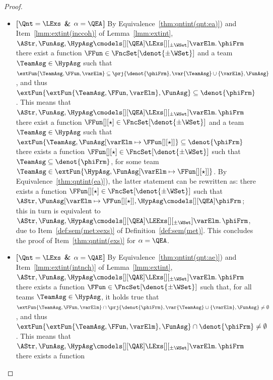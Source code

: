 \documentclass[authoryear]{elsarticle}
\newcommand{\EmpTeamAsg}{\emptyset}
\begin{document}
\begin{proof}
  \begin{itemize}[$\bullet$]
  \item\textbf{[$\Qnt = \LExs$ \& $\alpha = \QEA$]}
    By Equivalence~\ref{thm:qntint(qnt:ea)}) and Item~\ref{lmm:extint(inccoh)}
    of Lemma~\ref{lmm:extint}, $\AStr, \FunAsg, \HypAsg \cmodels[][\QEA]
    \LExs[][_{\pm\WSet}] \varElm \ldotp \phiFrm$ \iff there exist a function
    $\FFun \in \FncSet[\denot{\pm\WSet}]{}$ and a team $\TeamAsg \in \HypAsg$
    such that $\extFun{\TeamAsg, \FFun, \varElm} \subseteq \prj{\denot{\phiFrm},
      \var{\TeamAsg} \cup \{ \varElm \}, \FunAsg}$, and thus
    $\extFun{\extFun{\TeamAsg, \FFun, \varElm}, \FunAsg} \subseteq
    \denot{\phiFrm}$.
      This means that $\AStr, \FunAsg, \HypAsg \cmodels[][\QEA]
      \LExs[][_{\pm\WSet}] \varElm \ldotp \phiFrm$ \iff there exist a function
      $\FFun[][\star] \in \FncSet[\denot{\pm\WSet}]{}$ and a team $\TeamAsg \in
      \HypAsg$ such that $\extFun{\TeamAsg, {\FunAsg}[\varElm \mapsto
      \FFun[][\star]]} \subseteq \denot{\phiFrm}$ \iff there exists a function
      $\FFun[][\star] \in \FncSet[\denot{\pm\WSet}]{}$ such that $\TeamAsg
      \subseteq \denot{\phiFrm}$, for some team $\TeamAsg \in \extFun{\HypAsg,
      {\FunAsg}[\varElm \mapsto \FFun[][\star]]}$.
    By Equivalence~\ref{thm:qntint(ea)}), the latter statement can be rewritten
    as: there exists a function $\FFun[][\star] \in \FncSet[\denot{\pm\WSet}]{}$
    such that $\AStr, {\FunAsg}[\varElm \mapsto \FFun[][\star]], \HypAsg
    \cmodels[][\QEA] \phiFrm$; this in turn is equivalent to $\AStr, \FunAsg,
    \HypAsg \cmodels[][\QEA] \LEExs[][_{\pm\WSet}] \varElm \ldotp \phiFrm$,
    due to Item~\ref{def:sem(met:eexs)} of Definition~\ref{def:sem(met)}.
      This concludes the proof of Item~\ref{thm:qntint(exs)} for $\alpha
      = \QEA$.
    \item\textbf{[$\Qnt = \LExs$ \& $\alpha = \QAE$]}
      By Equivalence~\ref{thm:qntint(qnt:ae)}) and Item~\ref{lmm:extint(intnch)}
      of Lemma~\ref{lmm:extint}, $\AStr, \FunAsg, \HypAsg \cmodels[][\QAE]
      \LExs[][_{\pm\WSet}] \varElm \ldotp \phiFrm$ \iff there exists a function
      $\FFun \in \FncSet[\denot{\pm\WSet}]{}$ such that, for all teams $\TeamAsg
      \in \HypAsg$, it holds true that $\extFun{\TeamAsg, \FFun,
        \varElm} \cap \prj{\denot{\phiFrm}, \var{\TeamAsg} \cup \{ \varElm \},
        \FunAsg} \neq
      \EmpTeamAsg$, and thus $\extFun{\extFun{\TeamAsg, \FFun, \varElm},
        \FunAsg} \cap \denot{\phiFrm} \neq \EmpTeamAsg$.
      This means that $\AStr, \FunAsg, \HypAsg \cmodels[][\QAE]
      \LExs[][_{\pm\WSet}] \varElm \ldotp \phiFrm$ \iff there exists a function

\end{itemize}
\end{proof}
\end{document}
